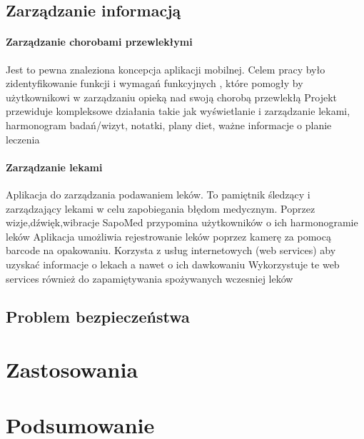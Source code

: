 \documentclass[11pt,twoside,a4paper]
{article}
\begin{document}
 
\subsection{Zarządzanie informacją}
\paragraph{Zarządzanie chorobami przewlekłymi\\}
Jest to pewna znaleziona koncepcja aplikacji mobilnej. Celem pracy było zidentyfikowanie funkcji i wymagań funkcyjnych , które pomogły by użytkownikowi w zarządzaniu opieką nad swoją chorobą przewlekłą
 Projekt przewiduje kompleksowe działania takie jak wyświetlanie i zarządzanie lekami, harmonogram badań/wizyt, notatki, plany diet, ważne informacje o planie leczenia

\paragraph{Zarządzanie lekami\\}
 Aplikacja do zarządzania podawaniem leków. To pamiętnik śledzący i zarządzający lekami w celu zapobiegania błędom medycznym. 
 Poprzez wizje,dźwięk,wibracje  SapoMed przypomina użytkowników o ich harmonogramie leków
 Aplikacja umożliwia rejestrowanie leków poprzez kamerę za pomocą barcode na opakowaniu. 
 Korzysta z usług internetowych (web services) aby uzyskać informacje o lekach a nawet o ich dawkowaniu
 Wykorzystuje te web services również do zapamiętywania spożywanych wczesniej leków 
\subsection{Problem bezpieczeństwa}
\section{Zastosowania}
\section{Podsumowanie}

\newpage


\end{document}
